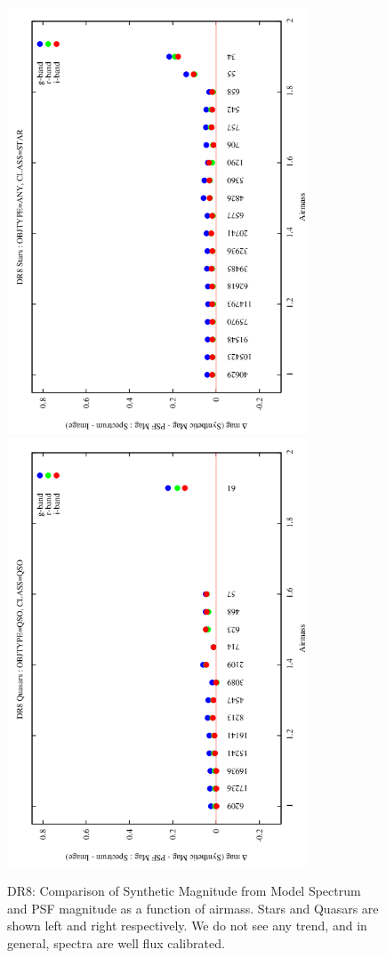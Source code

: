 \documentclass[apj,twocolumn]{aastex631}
\begin{document}
\begin{figure}%
\begin{center}
\includegraphics[angle=270,width=8.9cm]{figures/120821_01_airmass_vs_dmag_star_dr8.png}
\includegraphics[angle=270,width=8.9cm]{figures/120821_04_airmass_vs_dmag_quasar_dr8.png}
\caption{DR8: Comparison of Synthetic Magnitude from Model Spectrum and PSF magnitude as a function of airmass. Stars and Quasars are shown left and right respectively.  We do not see any trend, and in general, spectra are well flux calibrated.}
\end{center}
\end{figure}
\end{document}
